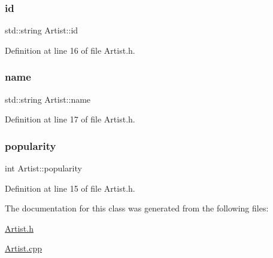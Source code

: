 \mbox{\label{class_artist_aa2320173c9ec00a99065fc8115af2fc5}} 
\subsubsection{\texorpdfstring{id}{id}}
{\footnotesize\ttfamily std\+::string Artist\+::id\hspace{0.3cm}{\ttfamily [private]}}



Definition at line 16 of file Artist.\+h.

\mbox{\label{class_artist_a41eed0ea0a3c2a0fb0b855c16bf2dbde}} 
\subsubsection{\texorpdfstring{name}{name}}
{\footnotesize\ttfamily std\+::string Artist\+::name\hspace{0.3cm}{\ttfamily [private]}}



Definition at line 17 of file Artist.\+h.

\mbox{\label{class_artist_acd7c260b4c2675900a34110b9129a425}} 
\subsubsection{\texorpdfstring{popularity}{popularity}}
{\footnotesize\ttfamily int Artist\+::popularity\hspace{0.3cm}{\ttfamily [private]}}



Definition at line 15 of file Artist.\+h.



The documentation for this class was generated from the following files\+:\begin{DoxyCompactItemize}
\item 
\mbox{\hyperlink{_artist_8h}{Artist.\+h}}\item 
\mbox{\hyperlink{_artist_8cpp}{Artist.\+cpp}}\end{DoxyCompactItemize}
